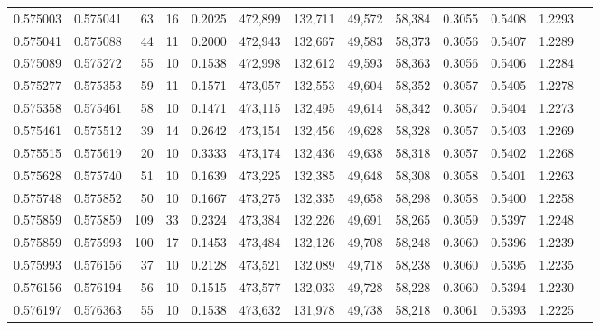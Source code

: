 \begin{tabular}{rrrrrrrrrrrrr}
0.575003 & 0.575041 &    63 &  16 &                                     0.2025 & 472,899 & 132,711 &  49,572 &  58,384 & 0.3055 & 0.5408 & 1.2293 \\
0.575041 & 0.575088 &    44 &  11 &                                     0.2000 & 472,943 & 132,667 &  49,583 &  58,373 & 0.3056 & 0.5407 & 1.2289 \\
0.575089 & 0.575272 &    55 &  10 &                                     0.1538 & 472,998 & 132,612 &  49,593 &  58,363 & 0.3056 & 0.5406 & 1.2284 \\
0.575277 & 0.575353 &    59 &  11 &                                     0.1571 & 473,057 & 132,553 &  49,604 &  58,352 & 0.3057 & 0.5405 & 1.2278 \\
0.575358 & 0.575461 &    58 &  10 &                                     0.1471 & 473,115 & 132,495 &  49,614 &  58,342 & 0.3057 & 0.5404 & 1.2273 \\
0.575461 & 0.575512 &    39 &  14 &                                     0.2642 & 473,154 & 132,456 &  49,628 &  58,328 & 0.3057 & 0.5403 & 1.2269 \\
0.575515 & 0.575619 &    20 &  10 &                                     0.3333 & 473,174 & 132,436 &  49,638 &  58,318 & 0.3057 & 0.5402 & 1.2268 \\
0.575628 & 0.575740 &    51 &  10 &                                     0.1639 & 473,225 & 132,385 &  49,648 &  58,308 & 0.3058 & 0.5401 & 1.2263 \\
0.575748 & 0.575852 &    50 &  10 &                                     0.1667 & 473,275 & 132,335 &  49,658 &  58,298 & 0.3058 & 0.5400 & 1.2258 \\
0.575859 & 0.575859 &   109 &  33 &                                     0.2324 & 473,384 & 132,226 &  49,691 &  58,265 & 0.3059 & 0.5397 & 1.2248 \\
0.575859 & 0.575993 &   100 &  17 &                                     0.1453 & 473,484 & 132,126 &  49,708 &  58,248 & 0.3060 & 0.5396 & 1.2239 \\
0.575993 & 0.576156 &    37 &  10 &                                     0.2128 & 473,521 & 132,089 &  49,718 &  58,238 & 0.3060 & 0.5395 & 1.2235 \\
0.576156 & 0.576194 &    56 &  10 &                                     0.1515 & 473,577 & 132,033 &  49,728 &  58,228 & 0.3060 & 0.5394 & 1.2230 \\
0.576197 & 0.576363 &    55 &  10 &                                     0.1538 & 473,632 & 131,978 &  49,738 &  58,218 & 0.3061 & 0.5393 & 1.2225 \\

\end{tabular}
